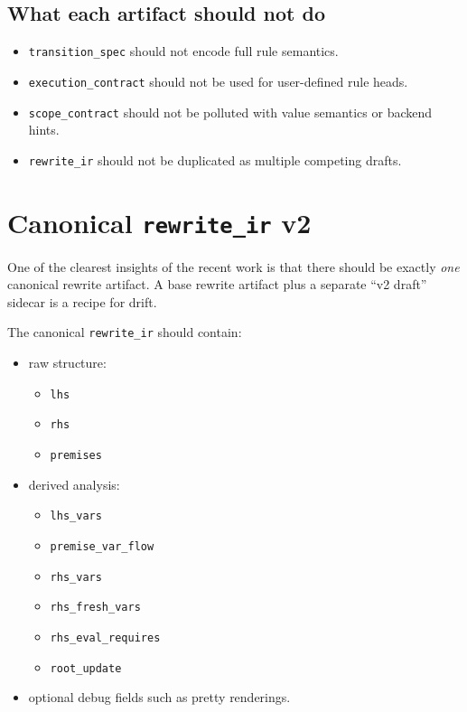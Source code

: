 \documentclass[11pt]{article}
\begin{document}
\subsection{What each artifact should not do}
\begin{itemize}
  \item \texttt{transition\_spec} should not encode full rule semantics.
  \item \texttt{execution\_contract} should not be used for user-defined rule heads.
  \item \texttt{scope\_contract} should not be polluted with value semantics or backend hints.
  \item \texttt{rewrite\_ir} should not be duplicated as multiple competing drafts.
\end{itemize}

\section{Canonical \texttt{rewrite\_ir} v2}

One of the clearest insights of the recent work is that there should be exactly \emph{one} canonical rewrite artifact. A base rewrite artifact plus a separate ``v2 draft'' sidecar is a recipe for drift.

The canonical \texttt{rewrite\_ir} should contain:
\begin{itemize}
  \item raw structure:
    \begin{itemize}
      \item \texttt{lhs}
      \item \texttt{rhs}
      \item \texttt{premises}
    \end{itemize}
  \item derived analysis:
    \begin{itemize}
      \item \texttt{lhs\_vars}
      \item \texttt{premise\_var\_flow}
      \item \texttt{rhs\_vars}
      \item \texttt{rhs\_fresh\_vars}
      \item \texttt{rhs\_eval\_requires}
      \item \texttt{root\_update}
    \end{itemize}
  \item optional debug fields such as pretty renderings.
\end{itemize}
\end{document}
